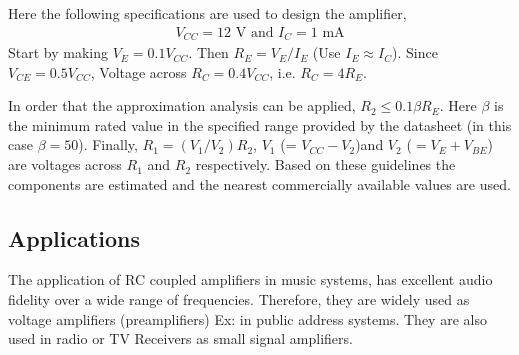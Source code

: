 Here the following specifications are used to design the amplifier,
\begin{align*}
    V_{CC} = 12 \text{ V and } I_C = 1 \text{ mA}
\end{align*}
Start by making $V_E= 0.1 V_{CC}$. Then $R_E = V_E/I_E$ (Use $I_E \approx I_C$).
Since $V_{CE} = 0.5 V_{CC}$, Voltage across $R_C = 0.4V_{CC}$, i.e. $R_C = 4R_E$.

In order that the approximation analysis can be applied, $R_2 \le 0.1 \beta R_E$. Here $\beta$ is the
minimum rated value in the specified range provided by the datasheet (in this
case $\beta=50$).
Finally,
$R_1 = (V_1/V_2) R_2$, $V_1$ (= $V_{CC}-V_2$)and $V_2$ ($= V_E+V_{BE}$) are voltages across $R_1$ and $R_2$ respectively.
Based on these guidelines the components are estimated and the nearest commercially
available values are used.

\subsection*{Applications}
The application of RC coupled amplifiers in music systems, has excellent audio fidelity over a wide range of frequencies. Therefore, they are widely used as voltage amplifiers (preamplifiers) Ex: in public address systems. They are also used in radio or TV Receivers as small signal amplifiers.